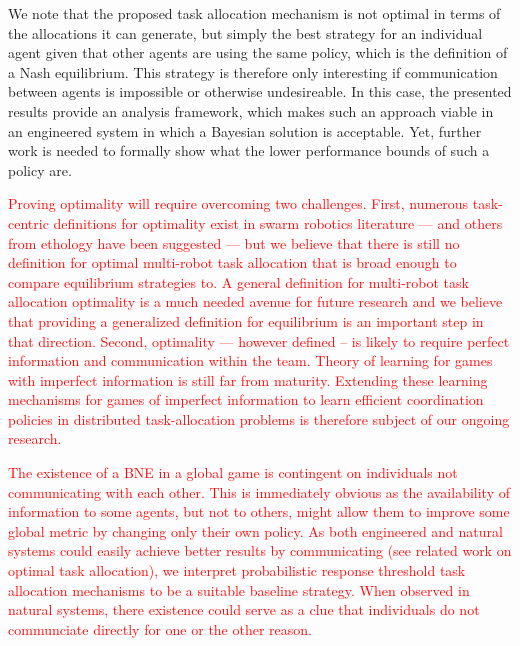 \documentclass[smallextended]{svjour3}       %
\newcommand{\edit}[1]{\textcolor{red}{#1}}
\begin{document}
We  note that the proposed task allocation mechanism is not optimal in terms of the allocations it can generate, but simply the best strategy for an individual agent given that other agents are using the same policy, which is the definition of a Nash equilibrium. This strategy is therefore only interesting if communication between agents is impossible or otherwise undesireable. In this case, the presented results provide an analysis framework, which makes such an approach viable in an engineered system in which a Bayesian solution is acceptable. Yet, further work is needed to formally show what the lower performance bounds of such a policy are. 

\edit{Proving optimality will require overcoming two challenges. First, numerous task-centric definitions for optimality exist in swarm robotics literature \citep{Gerkey2003} --- and others from ethology have been suggested \citep{Bonabeau2000} --- but we believe that there is still no definition for optimal multi-robot task allocation that is broad enough to compare equilibrium strategies to. A general definition for multi-robot task allocation optimality is a much needed avenue for future research and we believe that providing a generalized definition for equilibrium is an important step in that direction. Second, optimality --- however defined -- is likely to require perfect information and communication within the team. Theory of learning for games with imperfect information is still far from maturity. Extending these learning mechanisms for games of imperfect information to learn efficient coordination policies in distributed task-allocation problems is therefore subject of our ongoing research. }

\edit{The existence of a BNE in a global game is contingent on individuals not communicating with each other. This is immediately obvious as the availability of information to some agents, but not to others, might allow them to improve some global metric by changing only their own policy. As both engineered and natural systems could easily achieve better results by communicating (see related work on optimal task allocation), we interpret probabilistic response threshold task allocation mechanisms to be a suitable baseline strategy. When observed in natural systems, there existence could serve as a clue that individuals do not communciate directly for one or the other reason.}
\end{document}
